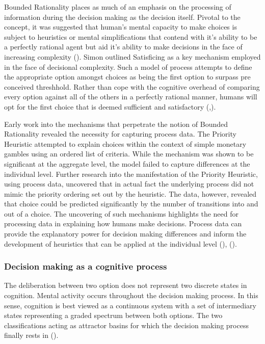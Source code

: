 \documentclass[man, floatsintext]{apa7}
\begin{document}
Bounded Rationality places as much of an emphasis on the processing of information during the decision making as the decision itself. Pivotal to the concept, it was suggested that human's mental capacity to make choices is subject to heuristics or mental simplifications that contend with it's ability to be a perfectly rational agent but aid it's ability to make decisions in the face of increasing complexity (\cite{payneTaskComplexityContingent1976}).  Simon outlined Satisficing as a key mechanism employed in the face of decisional complexity. Such a model of process attempts to define the appropriate option amongst choices as being the first option to surpass pre conceived threshhold. Rather than cope with the cognitive overhead of comparing every option against all of the others in a perfectly rational manner, humans will opt for the first choice that is deemed sufficient and satisfactory (\cite{simonBehavioralModelRational1955},\citeyear{simonRationalChoiceStructure1956d}).

Early work into the mechanisms that perpetrate the notion of Bounded Rationality revealed the necessity for capturing process data. The Priority Heuristic attempted to explain choices within the context of simple monetary gambles using an ordered list of criteria. While the mechanism was shown to be significant at the aggregate level, the model failed to capture differences at the individual level. Further research into the manifestation of the Priority Heuristic, using process data, uncovered that in actual fact the underlying process did not mimic the priority ordering set out by the heuristic. The data, however, revealed that choice could be predicted significantly by the number of transitions into and out of a choice. The uncovering of such mechanisms highlights the need for processing data in explaining how humans make decisions. Process data can provide the explanatory power for decision making differences and inform the development of heuristics that can be applied at the individual level (\cite{brandstatterPriorityHeuristicMaking2006}), (\cite{willemsenVisitingDecisionFactory2011}).

\subsubsection{Decision making as a cognitive process}

The deliberation between two option does not represent two discrete states in cognition. Mental activity occurs throughout the decision making process. In this sense, cognition is best viewed as a continuous system with a set of intermediary states representing a graded spectrum between both options. The two classifications acting as attractor basins for which the decision making process finally rests in (\cite{spiveyContinuousDynamicsRealTime2006}).
\end{document}
